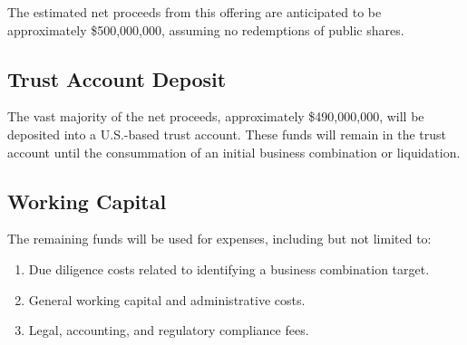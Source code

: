 
The estimated net proceeds from this offering are anticipated to be approximately \$500,000,000, assuming no redemptions of public shares.

\subsection{Trust Account Deposit}
The vast majority of the net proceeds, approximately \$490,000,000, will be deposited into a U.S.-based trust account. These funds will remain in the trust account until the consummation of an initial business combination or liquidation.

\subsection{Working Capital}
The remaining funds will be used for expenses, including but not limited to:
\begin{enumerate}
    \item Due diligence costs related to identifying a business combination target.
    \item General working capital and administrative costs.
    \item Legal, accounting, and regulatory compliance fees.
\end{enumerate}
